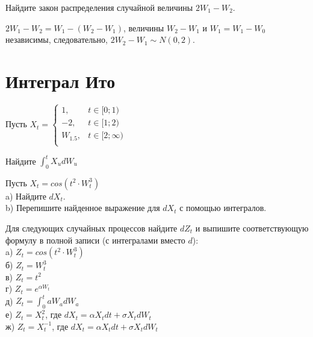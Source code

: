 \begin{problem}
Найдите закон распределения случайной величины $2W_1-W_2$.
\end{problem} 
\begin{solution} 
$2W_1-W_2=W_1-(W_2-W_1)$, величины $W_2-W_1$ и $W_1=W_1-W_0$ независимы, следовательно, $2W_2-W_1\sim N(0,2)$.
\end{solution}


\section{Интеграл Ито} 

\begin{problem}
Пусть $X_{t}=
\begin{cases}
1, & t\in[0;1) \\
-2, & t\in[1;2) \\
W_{1.5},& t\in[2;\infty) \\
\end{cases}$ 

Найдите $\int_{0}^{t}X_{u}dW_{u}$ 
\end{problem} 
\begin{solution} 

\end{solution}

\begin{problem}
Пусть $X_{t}=cos(t^{2}\cdot W_{t}^{3})$ \\
a) Найдите $dX_{t}$.\\
b) Перепишите найденное выражение для $dX_{t}$ с помощью интегралов. 
\end{problem} 
\begin{solution} 

\end{solution}

\begin{problem}
 Для следующих случайных процессов найдите $dZ_{t}$ и выпишите соответствующую формулу в полной записи (с интегралами вместо $d$): \\
a) $Z_{t}=cos(t^{2}\cdot W_{t}^{3})$ \\
б) $Z_{t}=W^{3}_{t}$ \\
в) $Z_{t}=t^{2}$ \\
г) $Z_{t}=e^{\alpha W_{t}}$ \\
д) $Z_{t}=\int_{0}^{t} aW_{a}dW_{a}$ \\
е) $Z_{t}=X^{2}_{t}$, где $dX_{t}=\alpha X_{t}dt+\sigma X_{t}dW_{t}$ \\
ж) $Z_{t}=X^{-1}_{t}$, где $dX_{t}=\alpha X_{t}dt+\sigma X_{t}dW_{t}$ 
\end{problem} 
\begin{solution} 

\end{solution}

